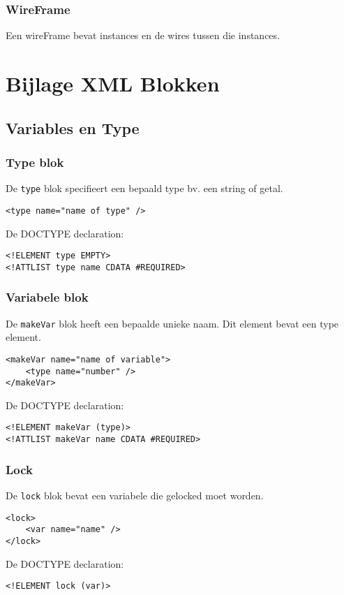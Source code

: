\documentclass[]{article}
\begin{document}
\subsubsection{WireFrame}
Een wireFrame bevat instances en de wires tussen die instances.


\section{Bijlage XML Blokken}
\label{bijlagexml}
\subsection{Variables en Type}
\subsubsection{Type blok}
De \texttt{type} blok specifieert een bepaald type bv. een string of getal.
\lstset{language=XML}
\begin{lstlisting}
<type name="name of type" />
\end{lstlisting}
De DOCTYPE declaration: 
\lstset{language=XML}
\begin{lstlisting}
<!ELEMENT type EMPTY>
<!ATTLIST type name CDATA #REQUIRED>
\end{lstlisting}

\subsubsection{Variabele blok}
De \texttt{makeVar} blok heeft een bepaalde unieke naam.	
Dit element bevat een type element.
\lstset{language=XML}
\begin{lstlisting}
<makeVar name="name of variable">
	<type name="number" />
</makeVar>
\end{lstlisting}
De DOCTYPE declaration: 
\lstset{language=XML}
\begin{lstlisting}
<!ELEMENT makeVar (type)>
<!ATTLIST makeVar name CDATA #REQUIRED>
\end{lstlisting}

\subsubsection{Lock}
De \texttt{lock} blok bevat een variabele die gelocked moet worden.	
\lstset{language=XML}
\begin{lstlisting}
<lock>
	<var name="name" />
</lock>
\end{lstlisting}
De DOCTYPE declaration: 
\lstset{language=XML}
\begin{lstlisting}
<!ELEMENT lock (var)>
\end{lstlisting}
\end{document}
